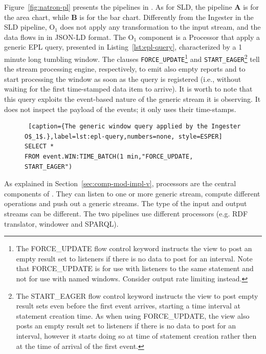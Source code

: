 Figure~\ref{fig:natron-pl} presents the pipelines in \sti{}. As for SLD, the pipeline \textbf{A} is for the area chart, while \textbf{B} is for the bar chart. 
Differently from the \textsf{Ingester} in the SLD pipeline, O$_1$ does not apply any transformation to the input stream, and the data flows in \sti{} in JSON-LD format.
The O$_1$ component is a \textsf{Processor} that apply a generic EPL query, presented in Listing~\ref{lst:epl-query}, characterized by a 1 minute long tumbling window.
The clauses \texttt{FORCE\_UPDATE}\footnote{The FORCE\_UPDATE flow control keyword instructs the view to post an empty result set to listeners if there is no data to post for an interval. Note that FORCE\_UPDATE is for use with listeners to the same statement and not for use with named windows. Consider output rate limiting instead.} and \texttt{START\_EAGER}\footnote{The START\_EAGER flow control keyword instructs the view to post empty result sets even before the first event arrives, starting a time interval at statement creation time. As when using FORCE\_UPDATE, the view also posts an empty result set to listeners if there is no data to post for an interval, however it starts doing so at time of statement creation rather then at the time of arrival of the first event.} tell the stream processing engine, respectively, to emit also empty reports and to start processing the window as soon as the query is registered (i.e., without waiting for the first time-stamped data item to arrive).
It is worth to note that this query exploits the event-based nature of the generic stream it is observing.
It does not inspect the payload of the events; it only uses their time-stamps.

\begin{figure}[ht]
\begin{minipage}{0.95\linewidth}
\begin{lstlisting} [caption={The generic window query applied by the Ingester O$_1$.},label=lst:epl-query,numbers=none, style=ESPER]
SELECT * 
FROM event.WIN:TIME_BATCH(1 min,"FORCE_UPDATE, START_EAGER")
\end{lstlisting}
\end{minipage}
\end{figure}

As explained in Section~\ref{sec:comp-mod-impl-v}, processors are the central components of \sti{}. They can listen to one or more generic stream, compute different operations and push out a generic streams. The type of the input and output streams can be different. The two pipelines use different processors (e.g. RDF translator, windower and SPARQL).


